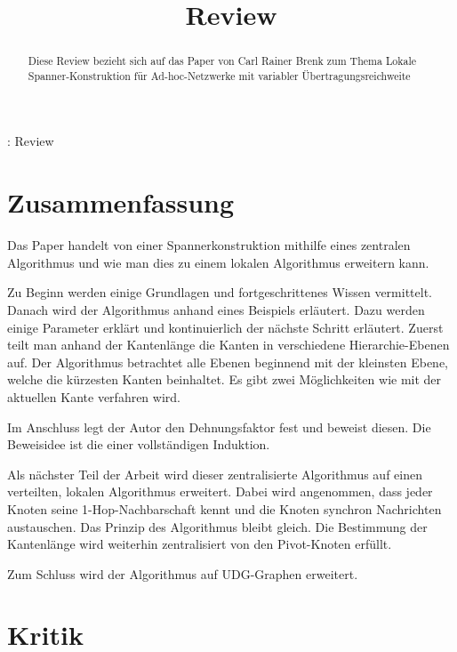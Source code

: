 \documentclass[a4paper,twoside]{IEEEtran}
\newcommand{\seminarteilnehmer}{}
\newcommand{\seminartitel}{Review}
\begin{document}
\title{\seminartitel}
\author{\seminarteilnehmer}

%
{\seminarteilnehmer: \seminartitel}


\maketitle

\begin{abstract}
Diese Review bezieht sich auf das Paper von Carl Rainer Brenk zum Thema \glqq Lokale Spanner-Konstruktion für Ad-hoc-Netzwerke
mit variabler Übertragungsreichweite\grqq
\end{abstract}

\section{Zusammenfassung}
Das Paper handelt von einer Spannerkonstruktion mithilfe eines zentralen Algorithmus und wie man dies zu einem lokalen Algorithmus erweitern kann.

Zu Beginn werden einige Grundlagen und fortgeschrittenes Wissen vermittelt.
Danach wird der Algorithmus anhand eines Beispiels erläutert.
Dazu werden einige Parameter erklärt und kontinuierlich der nächste Schritt erläutert.
Zuerst teilt man anhand der Kantenlänge die Kanten in verschiedene Hierarchie-Ebenen auf.
Der Algorithmus betrachtet alle Ebenen beginnend mit der kleinsten Ebene, welche die kürzesten Kanten beinhaltet. 
Es gibt zwei Möglichkeiten wie mit der aktuellen Kante verfahren wird.

Im Anschluss legt der Autor den Dehnungsfaktor fest und beweist diesen.
Die Beweisidee ist die einer vollständigen Induktion.

Als nächster Teil der Arbeit wird dieser zentralisierte Algorithmus auf einen verteilten, lokalen Algorithmus erweitert.
Dabei wird angenommen, dass jeder Knoten seine 1-Hop-Nachbarschaft kennt und die Knoten synchron Nachrichten austauschen.
Das Prinzip des Algorithmus bleibt gleich. 
Die Bestimmung der Kantenlänge wird weiterhin zentralisiert von den Pivot-Knoten erfüllt.

Zum Schluss wird der Algorithmus auf UDG-Graphen erweitert.




\section{Kritik}
\end{document}
